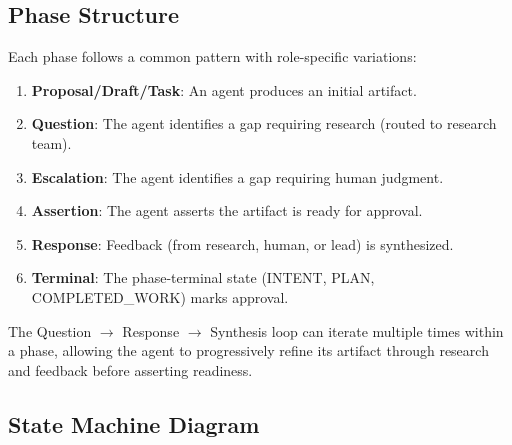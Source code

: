 \documentclass[11pt,a4paper]{article}
\begin{document}
\subsection{Phase Structure}

Each phase follows a common pattern with role-specific variations:

\begin{enumerate}
    \item \textbf{Proposal/Draft/Task}: An agent produces an initial artifact.
    \item \textbf{Question}: The agent identifies a gap requiring research (routed to research team).
    \item \textbf{Escalation}: The agent identifies a gap requiring human judgment.
    \item \textbf{Assertion}: The agent asserts the artifact is ready for approval.
    \item \textbf{Response}: Feedback (from research, human, or lead) is synthesized.
    \item \textbf{Terminal}: The phase-terminal state (INTENT, PLAN, COMPLETED\_WORK) marks approval.
\end{enumerate}

The Question $\to$ Response $\to$ Synthesis loop can iterate multiple
times within a phase, allowing the agent to progressively refine its
artifact through research and feedback before asserting readiness.

\subsection{State Machine Diagram}
\end{document}
